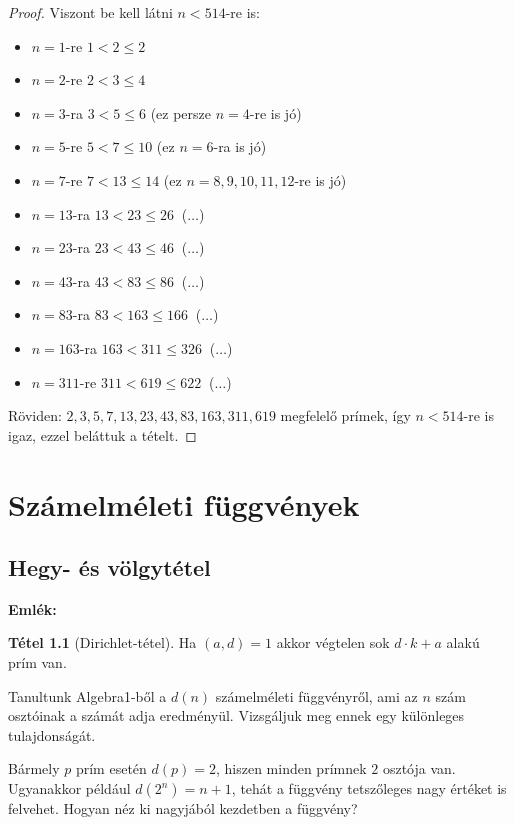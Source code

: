\documentclass[12pt]{book}
\theoremstyle{plain} %
\theoremstyle{definition} %
\newtheorem{theo/}{Tétel}[section]
\newenvironment{theo}
  {\renewcommand{\qedsymbol}{$\clubsuit$}%
   \pushQED{\qed}\begin{theo/}}
  {\popQED\end{theo/}}
\theoremstyle{remark}
\renewcommand\qedsymbol{$\blacksquare$}
\numberwithin{equation}{section}  %
\begin{document}
\begin{proof}
		Viszont be kell látni $n < 514$-re is:
		\begin{itemize}
			\item{$n = 1$-re $1<2\leq 2$}
			\item{$n = 2$-re $2<3\leq 4$}
			\item{$n = 3$-ra $3<5\leq 6$ (ez persze $n=4$-re is jó)}
			\item{$n = 5$-re $5<7\leq 10$ (ez $n=6$-ra is jó)}
			\item{$n = 7$-re $7<13\leq 14$ (ez $n=8,9,10,11,12$-re is jó)}
			\item{$n = 13$-ra $13<23\leq 26\ $ ($\ldots$)}
			\item{$n = 23$-ra $23<43\leq 46\ $ ($\ldots$)}
			\item{$n = 43$-ra $43<83\leq 86\ $ ($\ldots$)}
			\item{$n = 83$-ra $83<163\leq 166\ $ ($\ldots$)}
			\item{$n = 163$-ra $163<311\leq 326\ $ ($\ldots$)}
			\item{$n = 311$-re $311< 619 \leq 622\ $ ($\ldots$)}
		\end{itemize}
		Röviden: $2, 3, 5, 7, 13, 23, 43, 83, 163, 311, 619$ megfelelő prímek, így $n < 514$-re is igaz, ezzel beláttuk a tételt.
	\end{proof}


	\chapter{Számelméleti függvények}
	
	
	\section{Hegy- és völgytétel}
	
	\textbf{Emlék:}
	
	\begin{theo}[Dirichlet-tétel]
		Ha $(a,d)=1$ akkor végtelen sok $d\cdot k+a$ alakú prím van.
	\end{theo}
	
	Tanultunk Algebra1-ből a $d(n)$ számelméleti függvényről, ami az $n$ szám osztóinak a számát adja eredményül. Vizsgáljuk meg ennek egy különleges tulajdonságát.
	
	Bármely $p$ prím esetén $d(p)=2$, hiszen minden prímnek $2$ osztója van. Ugyanakkor például $d(2^{n}) = n+1$, tehát a függvény tetszőleges nagy értéket is felvehet. Hogyan néz ki nagyjából kezdetben a függvény?
	
\end{document}
